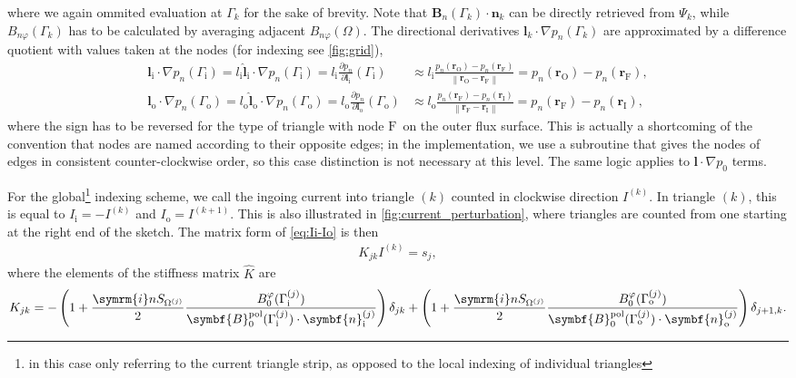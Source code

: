 \documentclass[a4paper, twoside, 10pt, english]{article}
\numberwithin{equation}{section}
\let\temp\varrho
\let\varrho\rho
\let\rho\temp
\let\temp\vartheta
\let\vartheta\theta
\let\theta\temp
\let\temp\varphi
\let\varphi\phi
\let\phi\temp
\let\vec\symbf
\newcommand*\grad{\ensuremath{\nabla}}
\newcommand*\im{\ensuremath{\symrm{i}}}  %
\newcommand*\pd[2][]{\ensuremath{\frac{\partial #1}{\partial #2}}}  %
\newcommand*\norm[1]{\ensuremath{\left \lVert #1 \right \rVert}}  %
\newcommand*\pol{\ensuremath{\textrm{pol}}}  %
\newcommand*\inw{\ensuremath{\textrm{i}}}  %
\newcommand*\out{\ensuremath{\textrm{o}}}  %
\newcommand*\vfs{\ensuremath{\textrm{F}}}  %
\newcommand*\vinw{\ensuremath{\textrm{I}}}  %
\newcommand*\vout{\ensuremath{\textrm{O}}}  %
\begin{document}
where we again ommited evaluation at $\Gamma_{k}$ for the sake of brevity. Note that $\vec{B}_{n} (\Gamma_{k}) \cdot \vec{n}_{k}$ can be directly retrieved from $\Psi_{k}$, while $B_{n \phi} (\Gamma_{k})$ has to be calculated by averaging adjacent $B_{n \phi} (\Omega)$. The directional derivatives $\vec{l}_{k} \cdot \grad p_{n} (\Gamma_{k})$ are approximated by a difference quotient with values taken at the nodes (for indexing see \cref{fig:grid}),
\begin{align}
  \vec{l}_{\inw} \cdot \grad p_{n} (\Gamma_{\inw}) = l_{\inw} \hat{\vec{l}}_{\inw} \cdot \grad p_{n} (\Gamma_{\inw}) = l_{\inw} \pd[p_{n}]{\vec{l}_{\inw}} (\Gamma_{\inw}) & \approx l_{\inw} \frac{p_{n} (\vec{r}_{\vout}) - p_{n} (\vec{r}_{\vfs})}{\norm{\vec{r}_{\vout} - \vec{r}_{\vfs}}} = p_{n} (\vec{r}_{\vout}) - p_{n} (\vec{r}_{\vfs}), \\
  \vec{l}_{\out} \cdot \grad p_{n} (\Gamma_{\out}) = l_{\out} \hat{\vec{l}}_{\out} \cdot \grad p_{n} (\Gamma_{\out}) = l_{\out} \pd[p_{n}]{\vec{l}_{\out}} (\Gamma_{\out}) & \approx l_{\out} \frac{p_{n} (\vec{r}_{\vfs}) - p_{n} (\vec{r}_{\vinw})}{\norm{\vec{r}_{\vfs} - \vec{r}_{\vinw}}} = p_{n} (\vec{r}_{\vfs}) - p_{n} (\vec{r}_{\vinw}),
\end{align}
where the sign has to be reversed for the type of triangle with node \vfs\ on the outer flux surface. This is actually a shortcoming of the convention that nodes are named according to their opposite edges; in the implementation, we use a subroutine that gives the nodes of edges in consistent counter-clockwise order, so this case distinction is not necessary at this level. The same logic applies to $\vec{l} \cdot \grad p_{0}$ terms.

For the global\footnote{in this case only referring to the current triangle strip, as opposed to the local indexing of individual triangles} indexing scheme, we call the ingoing current into triangle $(k)$ counted in clockwise direction $I^{(k)}$. In triangle $(k)$, this is equal to $I_{\inw} = -I^{(k)}$ and $I_{\out} = I^{(k+1)}$. This is also illustrated in \cref{fig:current_perturbation}, where triangles are counted from one starting at the right end of the sketch. The matrix form of \cref{eq:Ii-Io} is then
\begin{gather}
  K_{jk} I^{(k)} = s_{j},
\end{gather}
where the elements of the stiffness matrix $\hat{K}$ are
\begin{gather}
  K_{jk} = -\left ( 1 + \frac{\im n S_{\Omega^{(j)}}}{2} \frac{B_{0}^{\phi} (\Gamma_{\inw}^{(j)})}{\vec{B}_{0}^{\pol} (\Gamma_{\inw}^{(j)}) \cdot \vec{n}_{\inw}^{(j)}} \right) \delta_{jk} + \left( 1 + \frac{\im n S_{\Omega^{(j)}}}{2} \frac{B_{0}^{\phi} (\Gamma_{\out}^{(j)})}{\vec{B}_{0}^{\pol} (\Gamma_{\out}^{(j)}) \cdot \vec{n}_{\out}^{(j)}} \right) \delta_{j+1, k}.
\end{gather}
\end{document}
